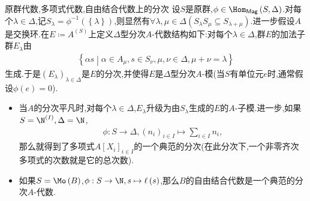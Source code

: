 \begin{example}{原群代数,多项式代数,自由结合代数上的分次}{}
	设$S$是原群,$\phi\in\Hom_{\mathsf{Mag}}\left(S,\Delta\right)$.对每个$\lambda\in\Delta$,记$S_{\lambda}=\phi^{-1}\left(\left\{\lambda\right\}\right)$,则显然有$\forall\lambda,\mu\in\Delta\left(S_{\lambda}S_{\mu}\subseteq S_{\lambda+\mu}\right)$.进一步假设$A$是交换环.在$E\coloneq A^{\left(S\right)}$上定义$\Delta$型分次$A$-代数结构如下:对每个$\lambda\in\Delta$,群$E$的加法子群$E_{\lambda}$由
	\begin{align*}
		\left\{\alpha s\middle|\alpha\in A_{\mu},s\in S_{\nu},\mu,\nu\in\Delta,\mu+\nu=\lambda\right\}
	\end{align*}
	生成.于是$\left(E_{\lambda}\right)_{\lambda\in\Delta}$是$E$的分次,并使得$E$是$\Delta$型分次$A$-模(当$S$有单位元$e$时,通常假设$\phi\left(e\right)=0$).
	\begin{itemize}
		\item 当$A$的分次平凡时,对每个$\lambda\in\Delta$,$E_{\lambda}$升级为由$S_{\lambda}$生成的$E$的$A$-子模.进一步,如果$S=\N^{\left(I\right)},\Delta=\N$,
		\begin{align*}
			\phi:S\to\Delta,\left(n_{i}\right)_{i\in I}\mapsto\sum\limits_{i\in I}n_{i},
		\end{align*}
		那么就得到了多项式$A\left[X_{i}\right]_{i\in I}$的一个典范的分次(在此分次下,一个非零齐次多项式的次数就是它的总次数).
		\item 如果$S=\Mo\left(B\right)$,$\phi:S\to\N,s\mapsto\ell\left(s\right)$,那么$B$的自由结合代数是一个典范的分次$A$-代数.
	\end{itemize}
\end{example}












